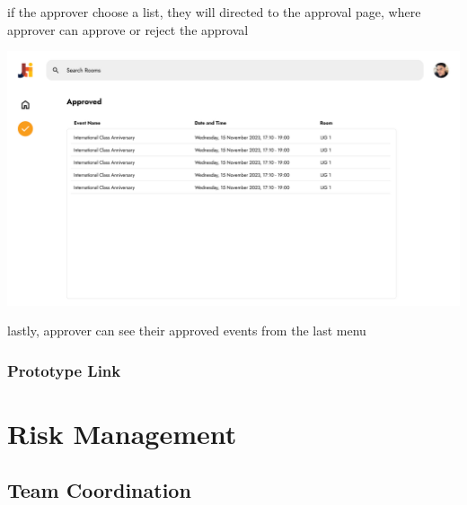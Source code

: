\documentclass[12pt,titlepage,a4paper]{report}
\begin{document}
    if the approver choose a list, they will directed to the approval page, where approver can approve or reject the approval
    \begin{center}
        \includegraphics[width=\textwidth]{images/figures/UIUX/approved.png}\\
    \end{center}
    lastly, approver can see their approved events from the last menu
    \subsection{Prototype Link}
    \noindent
\chapter{Risk Management}
    \section{Team Coordination}
\end{document}
